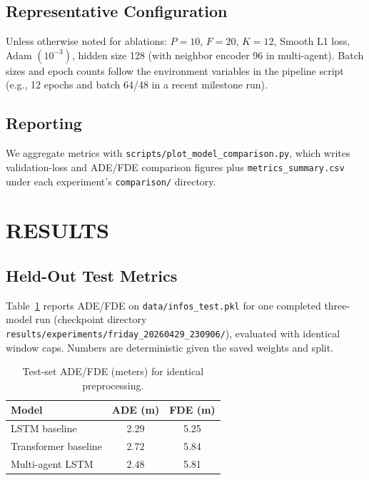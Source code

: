 \documentclass[letterpaper, 10 pt, conference]{ieeeconf}
\newcommand{\tabref}[1]{Table~\ref{#1}}
\begin{document}
\subsection{Representative Configuration}

Unless otherwise noted for ablations: $P{=}10$, $F{=}20$, $K{=}12$, Smooth L1 loss, Adam $(10^{-3})$, hidden size 128 (with neighbor encoder 96 in multi-agent). Batch sizes and epoch counts follow the environment variables in the pipeline script (e.g., 12 epochs and batch 64/48 in a recent milestone run).

\subsection{Reporting}

We aggregate metrics with \texttt{scripts/plot\_model\_comparison.py}, which writes validation-loss and ADE/FDE comparison figures plus \texttt{metrics\_summary.csv} under each experiment's \texttt{comparison/} directory.

\section{RESULTS}

\subsection{Held-Out Test Metrics}

\tabref{tab:three_models} reports ADE/FDE on \texttt{data/infos\_test.pkl} for one completed three-model run (checkpoint directory \texttt{results/experiments/friday\_20260429\_230906/}), evaluated with identical window caps. Numbers are deterministic given the saved weights and split.

\begin{table}[h]
\caption{Test-set ADE/FDE (meters) for identical preprocessing.}
\label{tab:three_models}
\begin{center}
\begin{tabular}{@{}lcc@{}}
\toprule
Model & ADE (m) & FDE (m) \\
\midrule
LSTM baseline & 2.29 & 5.25 \\
Transformer baseline & 2.72 & 5.84 \\
Multi-agent LSTM & 2.48 & 5.81 \\
\bottomrule
\end{tabular}
\end{center}
\end{table}
\end{document}
